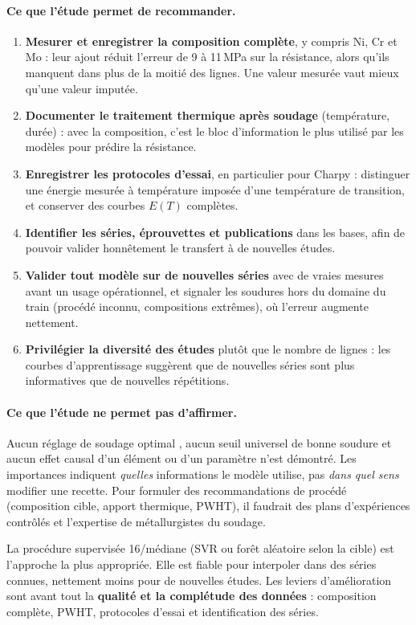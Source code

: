 \paragraph{Ce que l'étude permet de recommander.}
\begin{enumerate}
  \item \textbf{Mesurer et enregistrer la composition complète}, y compris Ni, Cr et Mo : leur ajout réduit l'erreur de 9 à 11\,MPa sur la résistance, alors qu'ils manquent dans plus de la moitié des lignes. Une valeur mesurée vaut mieux qu'une valeur imputée.
  \item \textbf{Documenter le traitement thermique après soudage} (température, durée) : avec la composition, c'est le bloc d'information le plus utilisé par les modèles pour prédire la résistance.
  \item \textbf{Enregistrer les protocoles d'essai}, en particulier pour Charpy : distinguer une énergie mesurée à température imposée d'une température de transition, et conserver des courbes $E(T)$ complètes.
  \item \textbf{Identifier les séries, éprouvettes et publications} dans les bases, afin de pouvoir valider honnêtement le transfert à de nouvelles études.
  \item \textbf{Valider tout modèle sur de nouvelles séries} avec de vraies mesures avant un usage opérationnel, et signaler les soudures hors du domaine du train (procédé inconnu, compositions extrêmes), où l'erreur augmente nettement.
  \item \textbf{Privilégier la diversité des études} plutôt que le nombre de lignes : les courbes d'apprentissage suggèrent que de nouvelles séries sont plus informatives que de nouvelles répétitions.
\end{enumerate}

\paragraph{Ce que l'étude ne permet pas d'affirmer.} Aucun réglage de soudage
\og optimal \fg{}, aucun seuil universel de bonne soudure et aucun effet causal
d'un élément ou d'un paramètre n'est démontré. Les importances indiquent
\emph{quelles} informations le modèle utilise, pas \emph{dans quel sens} modifier
une recette. Pour formuler des recommandations de procédé (composition cible,
apport thermique, PWHT), il faudrait des plans d'expériences contrôlés et
l'expertise de métallurgistes du soudage.

\begin{aretenir}
La procédure supervisée 16/médiane (SVR ou forêt aléatoire selon la cible) est
l'approche la plus appropriée. Elle est fiable pour interpoler dans des séries
connues, nettement moins pour de nouvelles études. Les leviers d'amélioration
sont avant tout la \textbf{qualité et la complétude des données} : composition
complète, PWHT, protocoles d'essai et identification des séries.
\end{aretenir}
